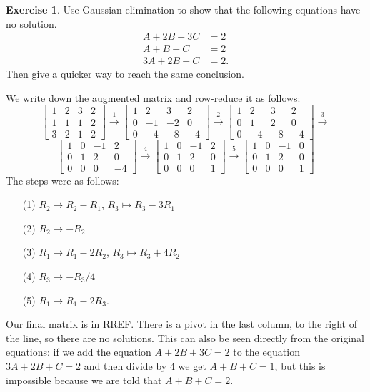 \documentclass[a4paper]{book}
\newcommand{\xra}       {\xrightarrow}
\renewcommand{\:}{\colon}
\theoremstyle{definition}
\newtheorem{exercise}[theorem]{Exercise}
\renewenvironment{solution}{\SolutionInline}{\endSolutionInline}
\begin{document}
\begin{exercise}
 Use Gaussian elimination to show that the following equations have no
 solution. 
 \begin{align*}
  A+2B+3C &= 2 \\
  A+B+C   &= 2 \\
  3A+2B+C &= 2.
 \end{align*}
 Then give a quicker way to reach the same conclusion.
\end{exercise}
\begin{solution}
 We write down the augmented matrix and row-reduce it as follows:
 {\small \[
  \left[\begin{array}{ccc|c}
    1 &  2 &  3 &  2 \\
    1 &  1 &  1 &  2 \\
    3 &  2 &  1 &  2
  \end{array}\right]
  \xra{1}
  \left[\begin{array}{ccc|c}
    1 &  2 &  3 &  2 \\
    0 & -1 & -2 &  0 \\
    0 & -4 & -8 & -4
  \end{array}\right]
  \xra{2}
  \left[\begin{array}{ccc|c}
    1 &  2 &  3 &  2 \\
    0 &  1 &  2 &  0 \\
    0 & -4 & -8 & -4
  \end{array}\right]
  \xra{3}
  \] \[ 
  \left[\begin{array}{ccc|c}
    1 &  0 & -1 &  2 \\
    0 &  1 &  2 &  0 \\
    0 &  0 &  0 & -4
  \end{array}\right]
  \xra{4}
  \left[\begin{array}{ccc|c}
    1 &  0 & -1 &  2 \\
    0 &  1 &  2 &  0 \\
    0 &  0 &  0 &  1
  \end{array}\right]
  \xra{5}
  \left[\begin{array}{ccc|c}
    1 &  0 & -1 &  0 \\
    0 &  1 &  2 &  0 \\
    0 &  0 &  0 &  1
  \end{array}\right]
 \]}
 The steps were as follows:
 \begin{itemize}
  \item[(1)] $R_2\mapsto R_2-R_1$, $R_3\mapsto R_3-3R_1$
  \item[(2)] $R_2\mapsto -R_2$
  \item[(3)] $R_1\mapsto R_1-2R_2$, $R_3\mapsto R_3+4R_2$
  \item[(4)] $R_3\mapsto -R_3/4$
  \item[(5)] $R_1\mapsto R_1-2R_3$.
 \end{itemize}
 Our final matrix is in RREF.  There is a pivot in the last column, to
 the right of the line, so there are no solutions.  This can also be
 seen directly from the original equations: if we add the equation
 $A+2B+3C=2$ to the equation $3A+2B+C=2$ and then divide by $4$ we get
 $A+B+C=1$, but this is impossible because we are told that $A+B+C=2$.
\end{solution}
\end{document}
